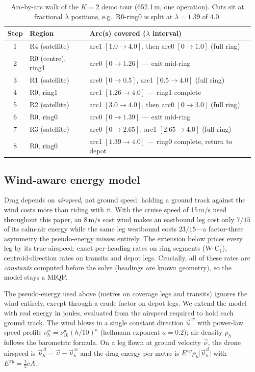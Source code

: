 \documentclass[12pt]{elsarticle}
\begin{document}
\begin{table}[t]
  \centering
  \caption{Arc-by-arc walk of the $K=2$ demo tour (652.1\,m, one operation). Cuts sit at fractional $\lambda$ positions, e.g.\ R0-ring0 is split at $\lambda=1.39$ of $4.0$.}
  \label{tab:k2-walk}
  \begin{tabular}{cll}
    \toprule
    Step & Region & Arc(s) covered ($\lambda$ interval) \\
    \midrule
    1 & R4 (satellite) & arc1 $[1.0{\to}4.0]$, then arc0 $[0{\to}1.0]$ (full ring) \\
    2 & R0 (centre), ring1 & arc0 $[0{\to}1.26]$ --- exit mid-ring \\
    3 & R1 (satellite) & arc0 $[0{\to}0.5]$, arc1 $[0.5{\to}4.0]$ (full ring) \\
    4 & R0, ring1 & arc1 $[1.26{\to}4.0]$ --- ring1 complete \\
    5 & R2 (satellite) & arc1 $[3.0{\to}4.0]$, then arc0 $[0{\to}3.0]$ (full ring) \\
    6 & R0, ring0 & arc0 $[0{\to}1.39]$ --- exit mid-ring \\
    7 & R3 (satellite) & arc0 $[0{\to}2.65]$, arc1 $[2.65{\to}4.0]$ (full ring) \\
    8 & R0, ring0 & arc1 $[1.39{\to}4.0]$ --- ring0 complete, return to depot \\
    \bottomrule
  \end{tabular}
\end{table}

\subsection{Wind-aware energy model}\label{sec:windaware}

Drag depends on \emph{airspeed}, not ground speed: holding a ground track against the wind costs more than riding with it. With the cruise speed of 15\,m/s used throughout this paper, an 8\,m/s east wind makes an eastbound leg cost only $7/15$ of its calm-air energy while the same leg westbound costs $23/15$---a factor-three asymmetry the pseudo-energy misses entirely. The extension below prices every leg by its true airspeed: exact per-heading rates on ring segments (W-C$_1$), centroid-direction rates on transits and depot legs. Crucially, all of these rates are \emph{constants} computed before the solve (headings are known geometry), so the model stays a MIQP.

The pseudo-energy used above (metres on coverage legs and transits) ignores the wind entirely, except through a crude factor on depot legs.  We extend the model with real energy in joules, evaluated from the airspeed required to hold each ground track.  The wind blows in a single constant direction $\vec u^{\,w}$ with power-law speed profile $\nu^w_h = \nu^w_{10}(h/10)^a$ (hellmann exponent $a=0.2$); air density $\rho_h$ follows the barometric formula.  On a leg flown at ground velocity $\vec\nu$, the drone airspeed is $\vec\nu^{\,d}_h = \vec\nu - \vec\nu^{\,w}_h$ and the drag energy per metre is $E^{xy}\rho_h \lvert\vec\nu^{\,d}_h\rvert$ with $E^{xy}=\tfrac12 cA$.
\end{document}

